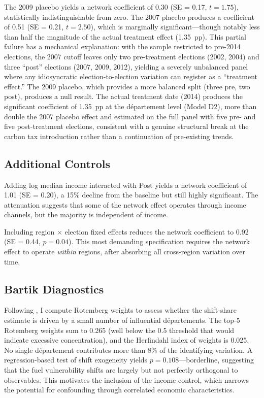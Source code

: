 \documentclass[12pt]{article}
\newcommand{\dept}{d\'{e}partement}
\newcommand{\depts}{d\'{e}partements}
\begin{document}
The 2009 placebo yields a network coefficient of 0.30 (SE = 0.17, $t = 1.75$), statistically indistinguishable from zero. The 2007 placebo produces a coefficient of 0.51 (SE = 0.21, $t = 2.50$), which is marginally significant---though notably less than half the magnitude of the actual treatment effect (1.35~pp). This partial failure has a mechanical explanation: with the sample restricted to pre-2014 elections, the 2007 cutoff leaves only two pre-treatment elections (2002, 2004) and three ``post'' elections (2007, 2009, 2012), yielding a severely unbalanced panel where any idiosyncratic election-to-election variation can register as a ``treatment effect.'' The 2009 placebo, which provides a more balanced split (three pre, two post), produces a null result. The actual treatment date (2014) produces the significant coefficient of 1.35~pp at the \dept{} level (Model D2), more than double the 2007 placebo effect and estimated on the full panel with five pre- and five post-treatment elections, consistent with a genuine structural break at the carbon tax introduction rather than a continuation of pre-existing trends.

\subsection{Additional Controls}

Adding log median income interacted with Post yields a network coefficient of 1.01 (SE = 0.20), a 15\% decline from the baseline but still highly significant. The attenuation suggests that some of the network effect operates through income channels, but the majority is independent of income.

Including region $\times$ election fixed effects reduces the network coefficient to 0.92 (SE = 0.44, $p = 0.04$). This most demanding specification requires the network effect to operate \emph{within} regions, after absorbing all cross-region variation over time.

\subsection{Bartik Diagnostics}

Following \citet{goldsmith2020bartik}, I compute Rotemberg weights to assess whether the shift-share estimate is driven by a small number of influential \depts{}. The top-5 Rotemberg weights sum to 0.265 (well below the 0.5 threshold that would indicate excessive concentration), and the Herfindahl index of weights is 0.025. No single \dept{} contributes more than 8\% of the identifying variation. A regression-based test of shift exogeneity yields $p = 0.108$---borderline, suggesting that the fuel vulnerability shifts are largely but not perfectly orthogonal to observables. This motivates the inclusion of the income control, which narrows the potential for confounding through correlated economic characteristics.
\end{document}
